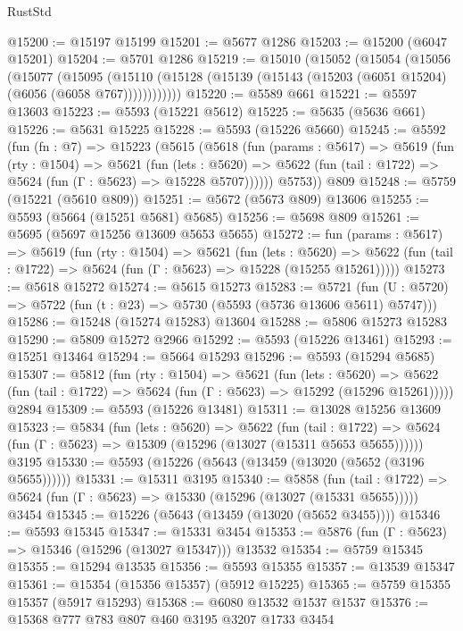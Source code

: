 \begin{lexlean}{RustStd}
\begin{coremodule}
@15200 := @15197 @15199
@15201 := @5677 @1286
@15203 := @15200 (@6047 @15201)
@15204 := @5701 @1286
@15219 := @15010
    (@15052
      (@15054
        (@15056
          (@15077
            (@15095
              (@15110 (@15128 (@15139 (@15143 (@15203 (@6051 @15204) (@6056 (@6058 @767))))))))))))
@15220 := @5589 @661
@15221 := @5597 @13603
@15223 := @5593 (@15221 @5612)
@15225 := @5635 (@5636 @661)
@15226 := @5631 @15225
@15228 := @5593 (@15226 @5660)
@15245 := @5592
    (fun (fn : @7) =>
    @15223
      (@5615
        (@5618
          (fun (params : @5617) =>
          @5619
            (fun (rty : @1504) =>
            @5621
              (fun (lets : @5620) =>
              @5622 (fun (tail : @1722) => @5624 (fun (Γ : @5623) => @15228 @5707))))))
        @5753))
    @809
@15248 := @5759 (@15221 (@5610 @809))
@15251 := @5672 (@5673 @809) @13606
@15255 := @5593 (@5664 (@15251 @5681) @5685)
@15256 := @5698 @809
@15261 := @5695 (@5697 @15256 @13609 @5653 @5655)
@15272 := fun (params : @5617) =>
  @5619
    (fun (rty : @1504) =>
    @5621
      (fun (lets : @5620) =>
      @5622 (fun (tail : @1722) => @5624 (fun (Γ : @5623) => @15228 (@15255 @15261)))))
@15273 := @5618 @15272
@15274 := @5615 @15273
@15283 := @5721
    (fun (U : @5720) => @5722 (fun (t : @23) => @5730 (@5593 (@5736 @13606 @5611) @5747)))
@15286 := @15248 (@15274 @15283) @13604
@15288 := @5806 @15273 @15283
@15290 := @5809 @15272 @2966
@15292 := @5593 (@15226 @13461)
@15293 := @15251 @13464
@15294 := @5664 @15293
@15296 := @5593 (@15294 @5685)
@15307 := @5812
    (fun (rty : @1504) =>
    @5621
      (fun (lets : @5620) =>
      @5622 (fun (tail : @1722) => @5624 (fun (Γ : @5623) => @15292 (@15296 @15261)))))
    @2894
@15309 := @5593 (@15226 @13481)
@15311 := @13028 @15256 @13609
@15323 := @5834
    (fun (lets : @5620) =>
    @5622
      (fun (tail : @1722) =>
      @5624 (fun (Γ : @5623) => @15309 (@15296 (@13027 (@15311 @5653 @5655))))))
    @3195
@15330 := @5593 (@15226 (@5643 (@13459 (@13020 (@5652 (@3196 @5655))))))
@15331 := @15311 @3195
@15340 := @5858
    (fun (tail : @1722) => @5624 (fun (Γ : @5623) => @15330 (@15296 (@13027 (@15331 @5655)))))
    @3454
@15345 := @15226 (@5643 (@13459 (@13020 (@5652 @3455))))
@15346 := @5593 @15345
@15347 := @15331 @3454
@15353 := @5876 (fun (Γ : @5623) => @15346 (@15296 (@13027 @15347))) @13532
@15354 := @5759 @15345
@15355 := @15294 @13535
@15356 := @5593 @15355
@15357 := @13539 @15347
@15361 := @15354 (@15356 @15357) (@5912 @15225)
@15365 := @5759 @15355 @15357 (@5917 @15293)
@15368 := @6080 @13532 @1537 @1537
@15376 := @15368 @777 @783 @807 @460 @3195 @3207 @1733 @3454

\end{coremodule}
\end{lexlean}
